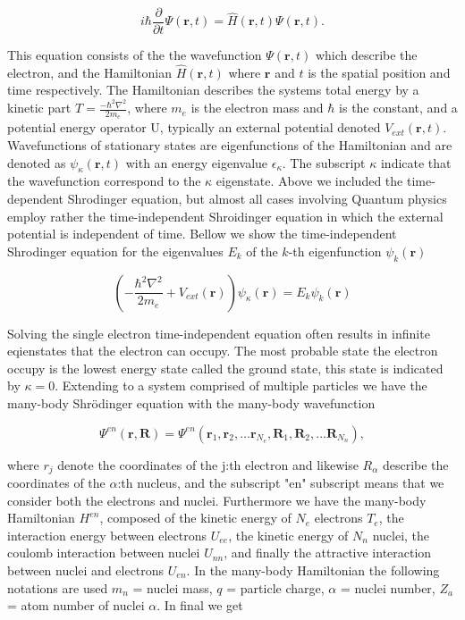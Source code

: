 \begin{equation}
    i\hbar\frac{\partial}{\partial t}\Psi(\boldsymbol{r}, t) = \hat{H}(\boldsymbol{r},t)\Psi(\boldsymbol{r}, t).
\end{equation}

This equation consists of the the wavefunction $\Psi(\boldsymbol{r},t)$ which describe the electron, and the Hamiltonian $\hat{H}(\boldsymbol{r},t)$ where $\boldsymbol{r}$ and $t$ is the spatial position and time respectively. The Hamiltonian describes the systems total energy by a kinetic part $T = \frac{-\hbar^2\nabla^2}{2m_e}$, where $m_e$ is the electron mass and $\hbar$ is the constant, and a potential energy operator U, typically an external potential denoted $V_{ext}(\boldsymbol{r}, t)$. Wavefunctions of stationary states are eigenfunctions of the Hamiltonian and are denoted as $\psi_{\kappa}(\boldsymbol{r}, t)$ with an energy eigenvalue $\epsilon_{\kappa}$. The subscript $\kappa$ indicate that the wavefunction correspond to the $\kappa$ eigenstate. Above we included the time-dependent Shrodinger equation, but almost all cases involving Quantum physics employ rather the time-independent Shroidinger equation in which the external potential is independent of time. Bellow we show the time-independent Shrodinger equation for the eigenvalues $E_k$ of the $k$-th eigenfunction $\psi_k(\boldsymbol{r})$

\begin{equation}
	\left(-\frac{\hbar^2\nabla^2}{2m_e} + V_{ext}(\boldsymbol{r}) \right)\psi_{\kappa}(\boldsymbol{r}) = E_k \psi_k(\boldsymbol{r})
\end{equation}

Solving the single electron time-independent equation often results in infinite eqienstates that the electron can occupy. The most probable state the electron occupy is the lowest energy state called the ground state, this state is indicated by $\kappa = 0$. Extending to a system comprised of multiple particles we have the many-body Shr\"{o}dinger equation with the many-body wavefunction 

\begin{equation}
\Psi^{en}(\boldsymbol{r}, \boldsymbol{R}) = \Psi^{en}(\boldsymbol{r}_1 , \boldsymbol{r}_2, \dots \boldsymbol{r}_{N_e}, \boldsymbol{R}_1, \boldsymbol{R}_2, \dots \boldsymbol{R}_{N_n}),
\end{equation}

where $r_j$ denote the coordinates of the j:th electron and likewise $R_{\alpha}$ describe the coordinates of the $\alpha$:th nucleus, and the subscript "en" subscript means that we consider both the electrons and nuclei. Furthermore we have the many-body Hamiltonian $H^{en}$, composed of the kinetic energy of $N_e$ electrons $T_e$, the interaction energy between electrons $U_{ee}$, the kinetic energy of $N_n$ nuclei, the coulomb interaction between nuclei $U_{nn}$, and finally the attractive interaction between nuclei and electrons $U_{en}$. In the many-body Hamiltonian the following notations are used $m_n$ = nuclei mass, $q$ = particle charge, $\alpha$ = nuclei number, $Z_a$ = atom number of nuclei $\alpha$. In final we get 

